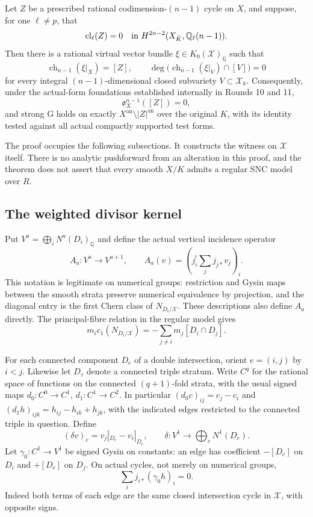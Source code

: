 \begin{theorem}
\label{r12n:main}
Let $Z$ be a prescribed rational codimension-$(n-1)$ cycle on $X$,
and suppose, for one $\ell\ne p$, that
\[
          \operatorname{cl}_{\ell}(Z)=0
          \quad\hbox{in }H^{2n-2}(X_{\bar K},\mathbb Q_\ell(n-1)).
\]
Then there is a rational virtual vector bundle
$\xi\in K_0(\mathcal X)_{\mathbb Q}$ such that
\[
 \operatorname{ch}_{n-1}(\xi|_X)=[Z],\qquad
 \deg\bigl(\operatorname{ch}_{n-1}(\xi|_V)\cap[V]\bigr)=0
\tag{NL2}\label{r12n:witness}
\]
for every integral $(n-1)$-dimensional closed subvariety
$V\subset\mathcal X_k$.  Consequently, under the actual-form
foundations established internally in Rounds 10 and 11,
\[
       \mathfrak o_X^{n-1}([Z])=0,
\]
and strong G holds on exactly $X^{\mathrm{an}}\setminus|Z|^{\mathrm{an}}$
over the original $K$, with its identity tested against all actual
compactly supported test forms.
\end{theorem}

The proof occupies the following subsections.  It constructs the
witness on $\mathcal X$ itself.  There is no analytic pushforward from
an alteration in this proof, and the theorem does not assert that every
smooth $X/K$ admits a regular SNC model over $R$.

\subsection{The weighted divisor kernel}

Put $V^a=\bigoplus_iN^a(D_i)_{\mathbb Q}$ and define the actual
vertical incidence operator
\[
 A_a:V^a\longrightarrow V^{a+1},\qquad
       A_a(v)=\left(j_i^!\sum_jj_{j*}v_j\right)_i.
\tag{NL3}\label{r12n:actual-A}
\]
This notation is legitimate on numerical groups: restriction and
Gysin maps between the smooth strata preserve numerical equivalence
by projection, and the diagonal entry is the first Chern class of
$N_{D_i/\mathcal X}$.  These descriptions also define $A_a$ directly.
The principal-fibre relation in the regular model gives
\[
 m_i c_1(N_{D_i/\mathcal X})
            =-\sum_{j\ne i}m_j[D_i\cap D_j].
\tag{NL4}\label{r12n:normal}
\]

For each connected component $D_e$ of a double intersection, orient
$e=(i,j)$ by $i<j$.  Likewise let $D_\tau$ denote a connected triple
stratum.  Write $C^q$ for the rational space of functions on the
connected $(q+1)$-fold strata, with the usual signed maps
$d_0:C^0\to C^1$, $d_1:C^1\to C^2$.  In particular
$(d_0c)_{ij}=c_j-c_i$ and
$(d_1h)_{ijk}=h_{ij}-h_{ik}+h_{jk}$, with the indicated edges restricted
to the connected triple in question.  Define
\[
 (\delta v)_e=v_j|_{D_e}-v_i|_{D_e},\qquad
       \delta:V^1\longrightarrow\bigoplus_eN^1(D_e).
\]
Let $\gamma_0:C^1\to V^1$ be signed Gysin on constants: an edge
has coefficient $-[D_e]$ on $D_i$ and $+[D_e]$ on $D_j$.
On actual cycles, not merely on numerical groups,
\[
                 \sum_i j_{i*}(\gamma_0h)_i=0.
\tag{NL5}\label{r12n:Jgamma}
\]
Indeed both terms of each edge are the same closed intersection
cycle in $\mathcal X$, with opposite signs.


